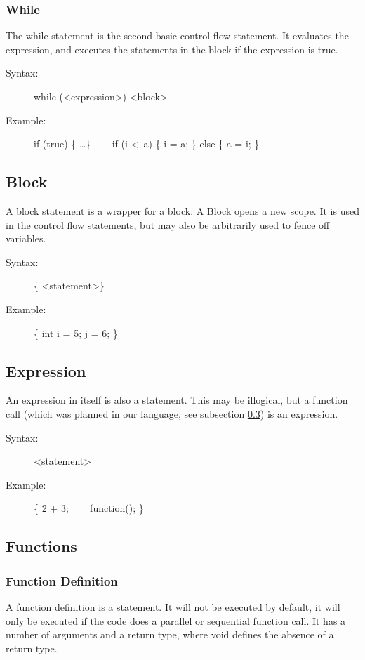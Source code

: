 \documentclass[10pt,a4paper]{report}
\begin{document}
\subsubsection*{While}
The while statement is the second basic control flow statement. It evaluates the expression, and executes the statements in the block if the expression is true.

\begin{description}
	\item[Syntax:] 
		while (\textless expression\textgreater ) \textless block\textgreater
	\item[Example:] 
		if (true) \{ \ldots \} ~~~
		if (i \textless ~a) \{ i = a; \} else \{ a = i; \}
\end{description} 


\subsection{Block}
A block statement is a wrapper for a block. A Block opens a new scope. It is used in the control flow statements, but may also be arbitrarily used to fence off variables.

\begin{description}
	\item[Syntax:] 
		\{ \textless statement\textgreater * \}
	\item[Example:] 
		\{ int i = 5; j = 6; \}
\end{description} 

\subsection{Expression}
An expression in itself is also a statement. This may be illogical, but a function call (which was planned in our language, see subsection \ref{subsec:functions}) is an expression.

\begin{description}
	\item[Syntax:] 
		\textless statement\textgreater
	\item[Example:] 
		\{ 2 + 3; ~~~ function(); \}
\end{description} 

\subsection{Functions} \label{subsec:functions}
\subsubsection{Function Definition}
A function definition is a statement. It will not be executed by default, it will only be executed if the code does a parallel or sequential function call. It has a number of arguments and a return type, where void defines the absence of a return type.
\end{document}
